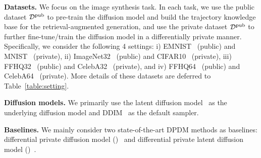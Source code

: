 {\bf Datasets.} We focus on the image synthesis task. In each task, we use the public dataset ${\mathcal{D}}^\mathrm{pub}$ to pre-train the diffusion model and build the trajectory knowledge base for the retrieval-augmented generation, and use the private dataset ${\mathcal{D}}^\mathrm{pub}$ to further fine-tune/train the diffusion model in a differentially private manner. Specifically, we consider the following 4 settings: i) EMNIST~\citep{cohen2017emnist} (public) and MNIST~\citep{deng2012mnist} (private), ii) ImageNet32~\citet{deng2009imagenet} (public) and CIFAR10~\citep{krizhevsky2009learning} (private), iii)  FFHQ32~\citep{karras2019style} (public) and CelebA32~\citep{liu2015faceattributes} (private), and iv) FFHQ64~\citep{karras2019style} (public) and CelebA64~\citep{liu2015faceattributes} (private). More details of these datasets are deferred to Table~\ref{table:setting}.



{\bf Diffusion models.} We primarily use the latent diffusion model~\citep{rombach2022high} as the underlying diffusion model and DDIM~\citep{song2020denoising} as the default sampler.

{\bf Baselines.} We mainly consider two state-of-the-art DPDM methods as baselines: differential private diffusion model (\dpdm)~\citep{dockhorn2022differentially} and differential private latent diffusion model (\dpldm)~\citet{lyu2023differentially}.

